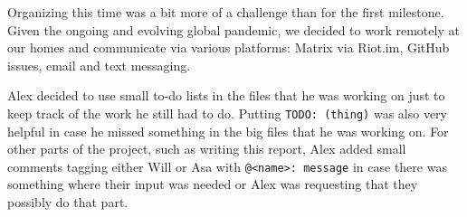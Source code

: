 \documentclass{article}
\begin{document}
Organizing this time was a bit more of a challenge than for the first milestone.
Given the ongoing and evolving global pandemic, we decided to work remotely at
our homes and communicate via various platforms: Matrix via Riot.im,
GitHub issues, email and text messaging.

Alex decided to use small to-do lists in the files that he was working on just
to keep track of the work he still had to do. Putting \verb|TODO: (thing)|
was also very helpful in case he missed something in the big files that he was
working on. For other parts of the project, such as writing this report, Alex
added small comments tagging either Will or Asa with \verb|@<name>: message| in
case there was something where their input was needed or Alex was requesting that
they possibly do that part.


\nocite{*}

{}

\end{document}
